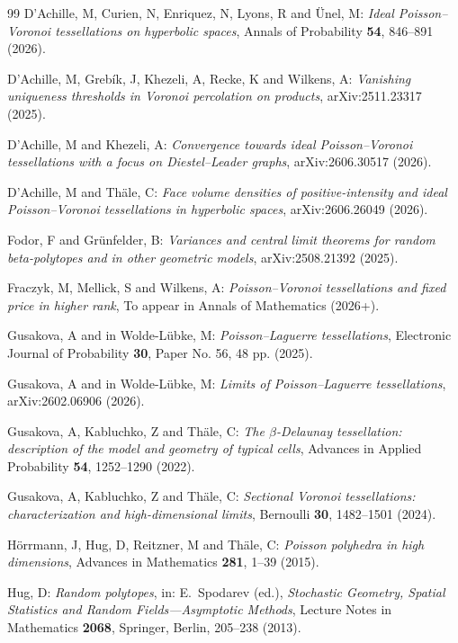 \documentclass[11pt,a4paper]{article}
\theoremstyle{plain}
\theoremstyle{definition}
\theoremstyle{remark}
\begin{document}
\begin{thebibliography}{99}
	D'Achille, M, Curien, N, Enriquez, N, Lyons, R and \"Unel, M:
	\emph{Ideal Poisson--Voronoi tessellations on hyperbolic spaces},
	Annals of Probability \textbf{54}, 846--891 (2026).

	D'Achille, M, Grebík, J, Khezeli, A, Recke, K and Wilkens, A:
	\emph{Vanishing uniqueness thresholds in Voronoi percolation on products},
	arXiv:2511.23317 (2025).

	D'Achille, M and Khezeli, A:
	\emph{Convergence towards ideal Poisson--Voronoi tessellations with a focus on Diestel--Leader graphs},
	arXiv:2606.30517 (2026).

	D'Achille, M and Th\"ale, C:
	\emph{Face volume densities of positive-intensity and ideal Poisson--Voronoi tessellations in hyperbolic spaces},
	arXiv:2606.26049 (2026).


	Fodor, F and Gr\"unfelder, B:
	\emph{Variances and central limit theorems for random beta-polytopes and in other geometric models},
	arXiv:2508.21392 (2025).


	Fraczyk, M, Mellick, S and Wilkens, A:
	\emph{Poisson--Voronoi tessellations and fixed price in higher rank},
	To appear in Annals of Mathematics (2026+).

	Gusakova, A and in Wolde-Lübke, M:
	\emph{Poisson--Laguerre tessellations},
	Electronic Journal of Probability \textbf{30}, Paper No. 56, 48 pp. (2025).


	Gusakova, A and in Wolde-Lübke, M:
	\emph{Limits of Poisson--Laguerre tessellations},
	arXiv:2602.06906 (2026).


	Gusakova, A, Kabluchko, Z and Th{\"a}le, C:
	\emph{The $\beta$-Delaunay tessellation: description of the model and geometry of typical cells},
	Advances in Applied Probability \textbf{54}, 1252--1290 (2022).

	Gusakova, A, Kabluchko, Z and Th{\"a}le, C:
	\emph{Sectional Voronoi tessellations: characterization and high-dimensional limits},
	Bernoulli \textbf{30}, 1482--1501 (2024).

	H\"orrmann, J, Hug, D, Reitzner, M and Th\"ale, C:
	\emph{Poisson polyhedra in high dimensions},
	Advances in Mathematics \textbf{281}, 1--39 (2015).

	Hug, D:
	\emph{Random polytopes},
	in: E.~Spodarev (ed.),
	\emph{Stochastic Geometry, Spatial Statistics and Random Fields---Asymptotic Methods},
	Lecture Notes in Mathematics \textbf{2068}, Springer, Berlin, 205--238 (2013).


\end{thebibliography}
\end{document}
